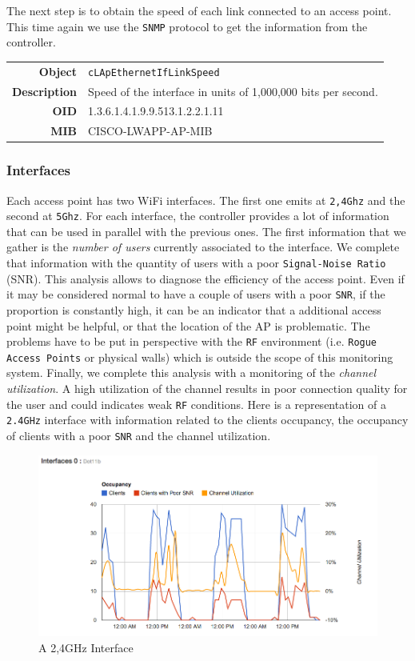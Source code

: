 The next step is to obtain the speed of each link connected to an access point. This time again we use the \texttt{SNMP} protocol to get the information from the controller.

\begin{tabular}{|r l|}
\hline
\textbf{Object} & \texttt{cLApEthernetIfLinkSpeed} \\
\textbf{Description} & \parbox{11cm}{Speed of the interface in units of 1,000,000 bits per second.} \\
\textbf{OID} & 1.3.6.1.4.1.9.9.513.1.2.2.1.11 \\
\textbf{MIB} & CISCO-LWAPP-AP-MIB \\
\hline
\end{tabular} 

\subsubsection*{Interfaces}
Each access point has two WiFi interfaces. The first one emits at \texttt{2,4Ghz} and the second at \texttt{5Ghz}. For each interface, the controller provides a lot of information that can be used in parallel with the previous ones. The first information that we gather is the \textit{number of users} currently associated to the interface. We complete that information with the quantity of users with a poor \texttt{Signal-Noise Ratio} (SNR). This analysis allows to diagnose the efficiency of the access point. Even if it may be considered normal to have a couple of users with a poor \texttt{SNR}, if the proportion is constantly high, it can be an indicator that a additional access point might be helpful, or that the location of the AP is problematic. The problems have to be put in perspective with the \texttt{RF} environment (i.e. \texttt{Rogue Access Points} or physical walls) which is outside the scope of this monitoring system. 
Finally, we complete this analysis with a monitoring of the \emph{channel utilization}. A high utilization of the channel results in poor connection quality for the user and could indicates weak \texttt{RF} conditions.
Here is a representation of a \texttt{2.4GHz} interface with information related to the clients occupancy, the occupancy of clients with a poor \texttt{SNR} and the channel utilization. 

\begin{figure}[H]
   \includegraphics[width=\textwidth]{Pictures/chapter5/interfaceLoad.png}
   \caption{A 2,4GHz Interface}
\end{figure}

